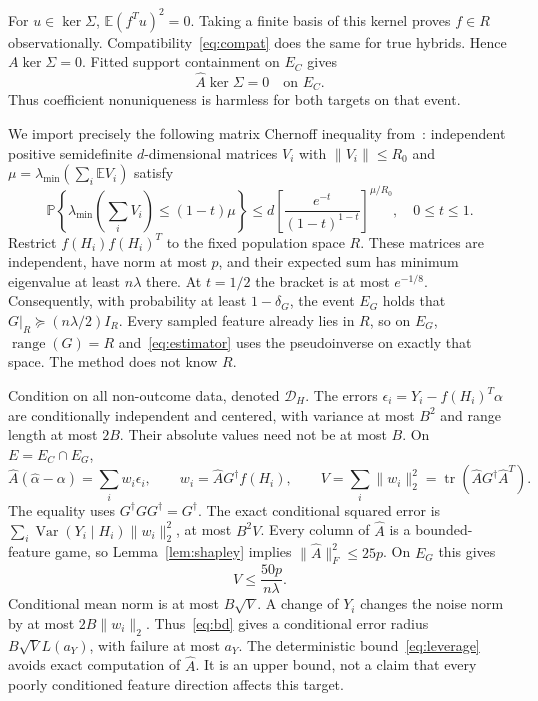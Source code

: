 \documentclass[11pt,a4paper]{article}
\numberwithin{equation}{section}
\theoremstyle{definition}
\newcommand{\E}{\mathbb E}
\newcommand{\Prb}{\mathbb P}
\DeclareMathOperator{\tr}{tr}
\DeclareMathOperator{\range}{range}
\begin{document}
For $u\in\ker\Sigma$, $\E(f^Tu)^2=0$. Taking a finite basis of this
kernel proves $f\in R$ observationally. Compatibility~\eqref{eq:compat}
does the same for true hybrids. Hence $A\ker\Sigma=0$. Fitted support
containment on $E_C$ gives
\begin{equation}\label{eq:annihilate}
 \widehat A\ker\Sigma=0\quad\text{on }E_C.
\end{equation}
Thus coefficient nonuniqueness is harmless for both targets on that event.

We import precisely the following matrix Chernoff inequality
from~\cite[Theorem 1.1]{tropp}: independent positive semidefinite
$d$-dimensional matrices $V_i$ with $\|V_i\|\le R_0$ and
$\mu=\lambda_{\min}(\sum_i\E V_i)$ satisfy
\[
 \Prb\left\{\lambda_{\min}\left(\sum_iV_i\right)
          \le(1-t)\mu\right\}
 \le d\left[\frac{e^{-t}}{(1-t)^{1-t}}\right]^{\mu/R_0},
 \quad 0\le t\le1.
\]
Restrict $f(H_i)f(H_i)^T$ to the fixed population space $R$.
These matrices are independent, have norm at most $p$, and their
expected sum has minimum eigenvalue at least $n\lambda$ there.
At $t=1/2$ the bracket is at most $e^{-1/8}$. Consequently, with
probability at least $1-\delta_G$, the event $E_G$ holds that
$G|_R\succeq(n\lambda/2)I_R$. Every sampled feature already lies in
$R$, so on $E_G$, $\range(G)=R$ and~\eqref{eq:estimator} uses the
pseudoinverse on exactly that space. The method does not know $R$.

Condition on all non-outcome data, denoted $\mathcal D_H$. The errors
$\epsilon_i=Y_i-f(H_i)^T\alpha$ are conditionally independent and
centered, with variance at most $B^2$ and range length at most $2B$.
Their absolute values need not be at most $B$. On $E=E_C\cap E_G$,
\begin{equation}\label{eq:noise}
 \widehat A(\widehat\alpha-\alpha)
   =\sum_i w_i\epsilon_i,\qquad
 w_i=\widehat A G^\dagger f(H_i),\qquad
 V=\sum_i\|w_i\|_2^2=\tr(\widehat A G^\dagger\widehat A^T).
\end{equation}
The equality uses $G^\dagger G G^\dagger=G^\dagger$.
The exact conditional squared error is
$\sum_i\operatorname{Var}(Y_i\mid H_i)\|w_i\|_2^2$, at most $B^2V$.
Every column of $\widehat A$ is a bounded-feature game, so
Lemma~\ref{lem:shapley} implies $\|\widehat A\|_F^2\le25p$.
On $E_G$ this gives
\begin{equation}\label{eq:leverage}
 V\le\frac{50p}{n\lambda}.
\end{equation}
Conditional mean norm is at most $B\sqrt V$. A change of $Y_i$ changes
the noise norm by at most $2B\|w_i\|_2$. Thus~\eqref{eq:bd} gives
a conditional error radius $B\sqrt V L(a_Y)$, with failure at most
$a_Y$. The deterministic bound~\eqref{eq:leverage} avoids exact
computation of $\widehat A$. It is an upper bound, not a claim that
every poorly conditioned feature direction affects this target.
\end{document}
